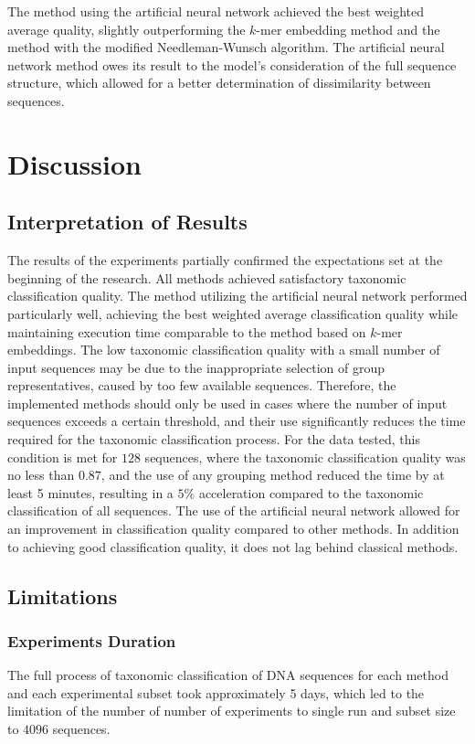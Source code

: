 \documentclass[pdflatex,sn-vancouver-num]{sn-jnl}%
\begin{document}
                The method using the artificial neural network achieved the best weighted average quality, slightly outperforming the $k$-mer embedding method and the method with the modified Needleman-Wunsch algorithm. The artificial neural network method owes its result to the model's consideration of the full sequence structure, which allowed for a better determination of dissimilarity between sequences.

    \section{Discussion}
        \subsection{Interpretation of Results}
            The results of the experiments partially confirmed the expectations set at the beginning of the research. All methods achieved satisfactory taxonomic classification quality. The method utilizing the artificial neural network performed particularly well, achieving the best weighted average classification quality while maintaining execution time comparable to the method based on $k$-mer embeddings. The low taxonomic classification quality with a small number of input sequences may be due to the inappropriate selection of group representatives, caused by too few available sequences. Therefore, the implemented methods should only be used in cases where the number of input sequences exceeds a certain threshold, and their use significantly reduces the time required for the taxonomic classification process. For the data tested, this condition is met for $128$ sequences, where the taxonomic classification quality was no less than $0.87$, and the use of any grouping method reduced the time by at least 5 minutes, resulting in a $5\%$ acceleration compared to the taxonomic classification of all sequences. The use of the artificial neural network allowed for an improvement in classification quality compared to other methods. In addition to achieving good classification quality, it does not lag behind classical methods.

        \subsection{Limitations}
            \subsubsection{Experiments Duration}
                The full process of taxonomic classification of DNA sequences for each method and each experimental subset took approximately 5 days, which led to the limitation of the number of number of experiments to single run and subset size to $4096$ sequences.
\end{document}
